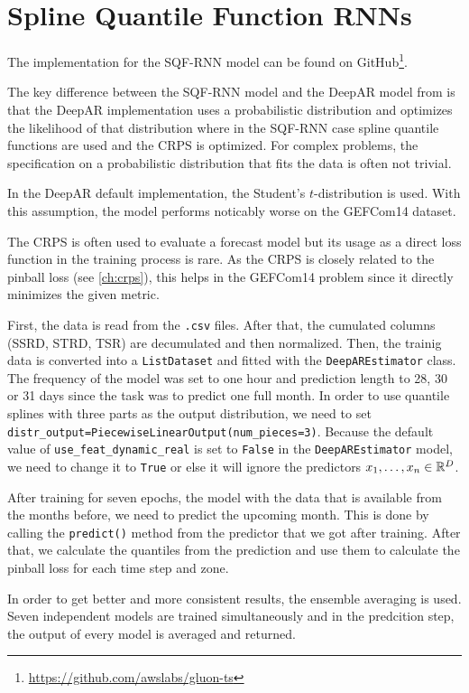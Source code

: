 \section{Spline Quantile Function RNNs}
\label{sec:implementation-sqf-rnn}

The implementation for the SQF-RNN model can be found on GitHub\footnote{\url{https://github.com/awslabs/gluon-ts}}.

The key difference between the SQF-RNN model and the DeepAR model from 
\Textcite{Salinas2017} is that the DeepAR implementation uses a 
probabilistic distribution and optimizes the likelihood of that distribution 
where in the SQF-RNN case spline quantile functions are used and the 
CRPS is optimized. 
For complex problems, the specification on a probabilistic distribution 
that fits the data is often not trivial. 

In the DeepAR default implementation, the Student's \(t\)-distribution is used. 
With this assumption, the model performs noticably worse on the GEFCom14 dataset.

The CRPS is often used to evaluate a forecast model but its usage as 
a direct loss function in the training process is rare. 
As the CRPS is closely related to the pinball loss (see \ref{ch:crps}), 
this helps in the GEFCom14 problem since it directly minimizes the given metric.

First, the data is read from the \texttt{.csv} files. 
After that, the cumulated columns (SSRD, STRD, TSR) are decumulated and then normalized.
Then, the trainig data is converted into a \texttt{ListDataset} and fitted with the 
\texttt{DeepAREstimator} class. The frequency of the model was set to one hour and 
prediction length to 28, 30 or 31 days since the task was to predict one full month. 
In order to use quantile splines with three parts as the output distribution, 
we need to set \texttt{distr\_output=PiecewiseLinearOutput(num\_pieces=3)}. 
Because the default value of \texttt{use\_feat\_dynamic\_real} is set to \texttt{False} 
in the \texttt{DeepAREstimator} model, 
we need to change it to \texttt{True} or else it will ignore the predictors 
\(x_1, \ldots, x_n \in \mathbb{R}^D\). 

After training for seven epochs, the model with the data that is available from the months before, 
we need to predict the upcoming month. This is done by calling the \texttt{predict()} 
method from the predictor that we got after training.
After that, we calculate the quantiles from the prediction and use them to 
calculate the pinball loss for each time step and zone.

In order to get better and more consistent results, the ensemble averaging is used. 
Seven independent models are trained simultaneously and in the predcition step, 
the output of every model is averaged and returned.
